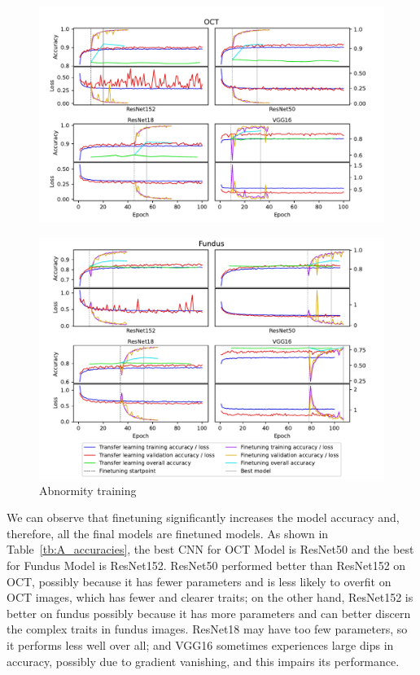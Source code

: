 \documentclass{article}
\begin{document}
	\begin{figure}[htbp]
		\centering
		\includegraphics[width=\linewidth]{Figs/abnormity_OCT_loss_and_acc.pdf}
	\end{figure}
	\begin{figure}[htbp]
		\centering
		\vspace{-1cm}
		\includegraphics[width=\linewidth]{Figs/abnormity_Fundus_loss_and_acc.pdf}
		\caption{Abnormity training}
		\vspace{0.3cm}
		\label{fig:A_train}
	\end{figure}
		
	\pagebreak
	
	\vspace{0.3cm}
	
	We can observe that finetuning significantly increases the model accuracy and, therefore, all the final models are finetuned models. As shown in Table~\ref{tb:A_accuracies}, the best CNN for OCT Model is ResNet50 and the best for Fundus Model is ResNet152. ResNet50 performed better than ResNet152 on OCT, possibly because it has fewer parameters and is less likely to overfit on OCT images, which has fewer and clearer traits; on the other hand, ResNet152 is better on fundus possibly because it has more parameters and can better discern the complex traits in fundus images. ResNet18 may have too few parameters, so it performs less well over all; and VGG16 sometimes experiences large dips in accuracy, possibly due to gradient vanishing, and this impairs its performance. 
	
\end{document}
